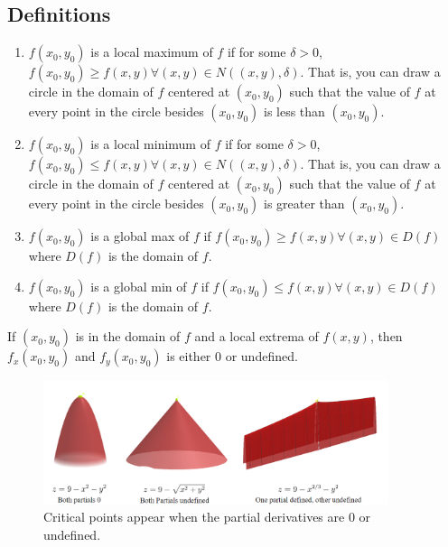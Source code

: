 \subsection{Definitions}
\begin{enumerate}
	\item $f(x_0, y_0)$ is a local maximum of $f$ if for some $\delta > 0$, $f(x_0, y_0) \geq f(x, y) \forall (x,y) \in N((x,y),\delta)$.
		That is, you can draw a circle in the domain of $f$ centered at $(x_0, y_0)$ such that the value of $f$ at every point in the circle besides $(x_0, y_0)$ is less than $(x_0, y_0)$.
	\item $f(x_0, y_0)$ is a local minimum of $f$ if for some $\delta > 0$, $f(x_0, y_0) \leq f(x,y) \forall (x,y) \in N((x,y),\delta)$.
		That is, you can draw a circle in the domain of $f$ centered at $(x_0, y_0)$ such that the value of $f$ at every point in the circle besides $(x_0, y_0)$ is greater than $(x_0, y_0)$.
	\item $f(x_0, y_0)$ is a global max of $f$ if $f(x_0, y_0) \geq f(x,y) \forall (x,y) \in D(f)$ where $D(f)$ is the domain of $f$.
	\item $f(x_0, y_0)$ is a global min of $f$ if $f(x_0, y_0) \leq f(x,y) \forall (x,y) \in D(f)$ where $D(f)$ is the domain of $f$.
\end{enumerate}
\begin{theorem}
	If $(x_0, y_0)$ is in the domain of $f$ and a local extrema of $f(x,y)$, then $f_x(x_0, y_0)$ and $f_y(x_0, y_0)$ is either 0 or undefined.
\end{theorem}

\begin{figure}[H]
	\centering
	\includegraphics[width=0.9\textwidth]{./differentialMultivariableCalculus/optimization.png}
	\caption{Critical points appear when the partial derivatives are 0 or undefined.}
\end{figure}